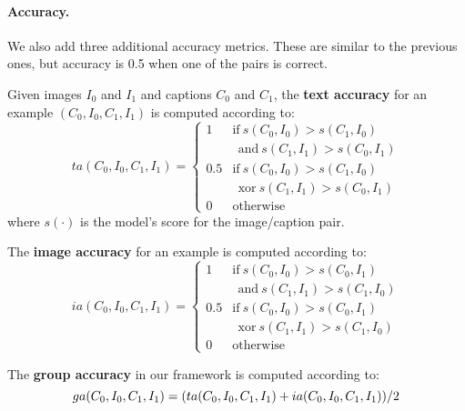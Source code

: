 \paragraph{Accuracy.}
We also add three additional accuracy metrics. These are similar to the previous ones, but accuracy is 0.5 when one of the pairs is correct.

Given images $I_0$ and $I_{1}$ and captions $C_{0}$ and $C_{1}$, the \textbf{text accuracy} for an example $(C_{0},I_{0},C_{1},I_{1})$ is computed according to:
\begin{equation}\label{eq:text-accuracy}
        ta(C_{0},I_{0},C_{1},I_{1})= 
    \begin{cases}
        1 & \text{if}\  s(C_{0}, I_{0}) > s(C_{1}, I_{0}) \\
        & \ \ \text{and}\ s(C_{1}, I_{1}) > s(C_{0}, I_{1}) \\
        0.5 & \text{if}\  s(C_{0}, I_{0}) > s(C_{1}, I_{0}) \\
        & \ \ \text{xor}\ s(C_{1}, I_{1}) > s(C_{0}, I_{1}) \\
        0              & \text{otherwise}
    \end{cases}
\end{equation}
where $s(\cdot)$ is the model's score for the image/caption pair.

The \textbf{image accuracy} for an example is computed according to:
\begin{equation}\label{eq:image-accuracy}
        ia(C_{0},I_{0},C_{1},I_{1})= 
    \begin{cases}
        1 & \text{if}\  s(C_{0}, I_{0}) > s(C_{0}, I_{1})\\
        & \ \ \text{and}\ s(C_{1}, I_{1}) > s(C_{1}, I_{0}) \\
        0.5 & \text{if}\  s(C_{0}, I_{0}) > s(C_{0}, I_{1})\\
        & \ \ \text{xor}\ s(C_{1}, I_{1}) > s(C_{1}, I_{0}) \\
        0              & \text{otherwise}
    \end{cases}
\end{equation}

The \textbf{group accuracy} in our framework is computed according to:
\begin{equation}\label{eq:group-accuracy}
        ga(C_{0},I_{0},C_{1},I_{1})= 
        (ta(C_{0},I_{0},C_{1},I_{1}) + ia(C_{0},I_{0},C_{1},I_{1})) / 2\\
\end{equation}

